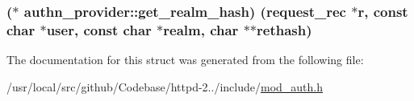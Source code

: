 \subsubsection[{\texorpdfstring{get\+\_\+realm\+\_\+hash}{get_realm_hash}}]{($\ast$ authn\+\_\+provider\+::get\+\_\+realm\+\_\+hash) ({\bf request\+\_\+rec} $\ast${\bf r}, const char $\ast$user, const char $\ast$realm, char $\ast$$\ast$rethash)}\hypertarget{structauthn__provider_a982a3f69a8787c09d73db0befa67a6f3}{}\label{structauthn__provider_a982a3f69a8787c09d73db0befa67a6f3}


The documentation for this struct was generated from the following file\+:\begin{DoxyCompactItemize}
\item 
/usr/local/src/github/\+Codebase/httpd-\/2../include/\hyperlink{mod__auth_8h}{mod\+\_\+auth.\+h}\end{DoxyCompactItemize}
